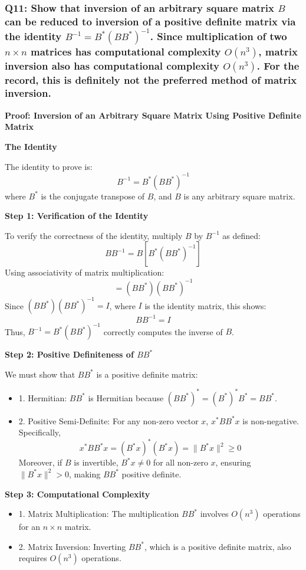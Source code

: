 \documentclass[8pt]{article}
\begin{document}
\subsubsection*{Q11: Show that inversion of an arbitrary square matrix \(B\) can be reduced to inversion of a positive definite matrix via the identity \(B^{-1} = B^* (B B^*)^{-1}\). Since multiplication of two \(n \times n\) matrices has computational complexity \(O(n^3)\), matrix inversion also has computational complexity \(O(n^3)\). For the record, this is definitely not the preferred method of matrix inversion.}

\textbf{Proof: Inversion of an Arbitrary Square Matrix Using Positive Definite Matrix}

\textbf{The Identity}

The identity to prove is:
\[ B^{-1} = B^* (BB^*)^{-1} \]
where \( B^* \) is the conjugate transpose of \( B \), and \( B \) is any arbitrary square matrix.

\textbf{Step 1: Verification of the Identity}

To verify the correctness of the identity, multiply \( B \) by \( B^{-1} \) as defined:
\[ B B^{-1} = B [B^* (BB^*)^{-1}] \]
Using associativity of matrix multiplication:
\[ = (BB^*)(BB^*)^{-1} \]
Since \( (BB^*) (BB^*)^{-1} = I \), where \( I \) is the identity matrix, this shows:
\[ B B^{-1} = I \]
Thus, \( B^{-1} = B^* (BB^*)^{-1} \) correctly computes the inverse of \( B \).

\textbf{Step 2: Positive Definiteness of \( BB^* \)}

We must show that \( BB^* \) is a positive definite matrix:
\begin{itemize}
    \item 1. Hermitian: \( BB^* \) is Hermitian because \( (BB^*)^* = (B^*)^*B^* = BB^* \).
    \item 2. Positive Semi-Definite: For any non-zero vector \( x \), \( x^*BB^*x \) is non-negative. Specifically,
     \[ x^*BB^*x = (B^*x)^*(B^*x) = \|B^*x\|^2 \geq 0 \]
     Moreover, if \( B \) is invertible, \( B^*x \neq 0 \) for all non-zero \( x \), ensuring \( \|B^*x\|^2 > 0 \), making \( BB^* \) positive definite.
\end{itemize}

\textbf{Step 3: Computational Complexity}

\begin{itemize}
    \item 1. Matrix Multiplication: The multiplication \( BB^* \) involves \( O(n^3) \) operations for an \( n \times n \) matrix.
    \item 2. Matrix Inversion: Inverting \( BB^* \), which is a positive definite matrix, also requires \( O(n^3) \) operations.
\end{itemize}
\end{document}
